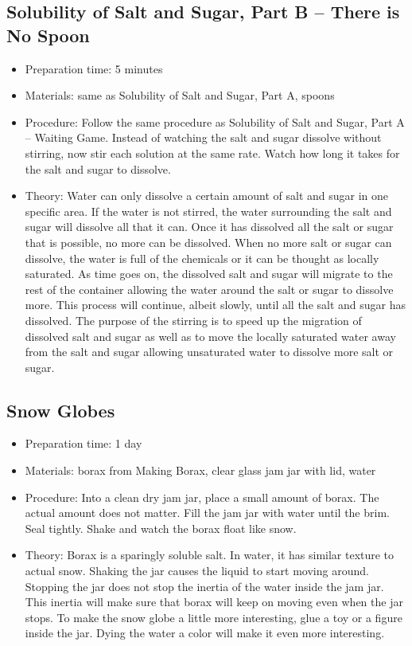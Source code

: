 \subsection{Solubility of Salt and Sugar, Part B – There is No Spoon}
\begin{itemize}
\item{Preparation time: 5 minutes}
\item{Materials: same as Solubility of Salt and Sugar, Part A, spoons}
\item{Procedure: Follow the same procedure as Solubility of Salt and Sugar, Part A – Waiting Game. Instead of watching the salt and sugar dissolve without stirring, now stir each solution at the same rate. Watch how long it takes for the salt and sugar to dissolve.}
\item{Theory: Water can only dissolve a certain amount of salt and sugar in one specific area. If the water is not stirred, the water surrounding the salt and sugar will dissolve all that it can. Once it has dissolved all the salt or sugar that is possible, no more can be dissolved. When no more salt or sugar can dissolve, the water is full of the chemicals or it can be thought as locally saturated. As time goes on, the dissolved salt and sugar will migrate to the rest of the container allowing the water around the salt or sugar to dissolve more. This process will continue, albeit slowly, until all the salt and sugar has dissolved. The purpose of the stirring is to speed up the migration of dissolved salt and sugar as well as to move the locally saturated water away from the salt and sugar allowing unsaturated water to dissolve more salt or sugar.}
\end{itemize}

\subsection{Snow Globes}
\begin{itemize}
\item{Preparation time: 1 day}
\item{Materials: borax from Making Borax, clear glass jam jar with lid, water}
\item{Procedure: Into a clean dry jam jar, place a small amount of borax. The actual amount does not matter. Fill the jam jar with water until the brim. Seal tightly. Shake and watch the borax float like snow.}
\item{Theory: Borax is a sparingly soluble salt. In water, it has similar texture to actual snow. Shaking the jar causes the liquid to start moving around. Stopping the jar does not stop the inertia of the water inside the jam jar. This inertia will make sure that borax will keep on moving even when the jar stops. To make the snow globe a little more interesting, glue a toy or a figure inside the jar. Dying the water a color will make it even more interesting. }
\end{itemize}

